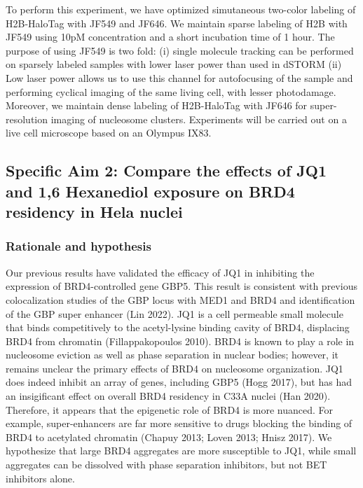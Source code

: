\documentclass{ucetd}
\begin{document}
To perform this experiment, we have optimized simutaneous two-color labeling of H2B-HaloTag with JF549 and JF646. We maintain sparse labeling of H2B with JF549 using 10pM concentration and a short incubation time of 1 hour. The purpose of using JF549 is two fold: (i) single molecule tracking can be performed on sparsely labeled samples with lower laser power than used in dSTORM (ii) Low laser power allows us to use this channel for autofocusing of the sample and performing cyclical imaging of the same living cell, with lesser photodamage. Moreover, we maintain dense labeling of H2B-HaloTag with JF646 for super-resolution imaging of nucleosome clusters. Experiments will be carried out on a live cell microscope based on an Olympus IX83.


\subsection{Specific Aim 2: Compare the effects of JQ1 and 1,6 Hexanediol exposure on BRD4 residency in Hela nuclei}


\subsubsection{Rationale and hypothesis}

Our previous results have validated the efficacy of JQ1 in inhibiting the expression of BRD4-controlled gene GBP5. This result is consistent with previous colocalization studies of the GBP locus with MED1 and BRD4 and identification of the GBP super enhancer (Lin 2022). JQ1 is a cell permeable small molecule that binds competitively to the acetyl-lysine binding cavity of BRD4, displacing BRD4 from chromatin (Fillappakopoulos 2010). BRD4 is known to play a role in nucleosome eviction as well as phase separation in nuclear bodies; however, it remains unclear the primary effects of BRD4 on nucleosome organization. JQ1 does indeed inhibit an array of genes, including GBP5 (Hogg 2017), but has had an insigificant effect on overall BRD4 residency in C33A nuclei (Han 2020). Therefore, it appears that the epigenetic role of BRD4 is more nuanced. For example, super-enhancers are far more sensitive to drugs blocking the binding of BRD4 to acetylated chromatin (Chapuy 2013; Loven 2013; Hnisz 2017). We hypothesize that large BRD4 aggregates are more susceptible to JQ1, while small aggregates can be dissolved with phase separation inhibitors, but not BET inhibitors alone.
\end{document}
